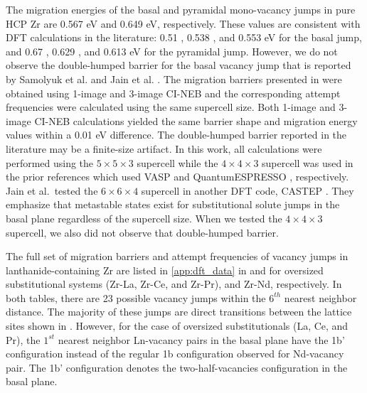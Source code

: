 \documentclass[preprint,12pt]{elsarticle}
\begin{document}
The migration energies of the basal and pyramidal mono-vacancy jumps in pure HCP Zr are 0.567 eV and 0.649 eV, respectively. These values are consistent with DFT calculations in the literature: 0.51 \cite{verite_anisotropy_2007}, 0.538 \cite{samolyuk_analysis_2014}, and 0.553 \cite{jain_first-principles_2019} eV for the basal jump, and  0.67 \cite{verite_anisotropy_2007}, 0.629 \cite{samolyuk_analysis_2014}, and 0.613 \cite{jain_first-principles_2019} eV for the pyramidal jump. However, we do not observe the double-humped barrier for the basal vacancy jump that is reported by Samolyuk et al. \cite{samolyuk_analysis_2014} and Jain et al. \cite{jain_first-principles_2019}. The migration barriers presented in  were obtained using 1-image and 3-image CI-NEB and the corresponding attempt frequencies were calculated using the same supercell size. Both 1-image and 3-image CI-NEB calculations yielded the same barrier shape and migration energy values within a 0.01 eV difference. The double-humped barrier reported in the literature may be a finite-size artifact. In this work, all calculations were performed using the $5\times5\times3$ supercell while the $4\times4\times3$ supercell was used in the prior references \cite{samolyuk_analysis_2014, jain_first-principles_2019} which used VASP \cite{kresse_ab_1993} and QuantumESPRESSO \cite{giannozzi_quantum_2009}, respectively. Jain et al.~tested the $6\times6\times4$ supercell \cite{jain_first-principles_2019} in another DFT code, CASTEP \cite{clark_first_2005}. They emphasize that metastable states exist for substitutional solute jumps in the basal plane regardless of the supercell size. When we tested the $4\times4\times3$ supercell, we also did not observe that double-humped barrier.

The full set of migration barriers and attempt frequencies of vacancy jumps in lanthanide-containing Zr are listed in \ref{app:dft_data} in  and  for oversized substitutional systems (Zr-La, Zr-Ce, and Zr-Pr), and Zr-Nd, respectively. In both tables, there are 23 possible vacancy jumps within the $6^{th}$ nearest neighbor distance. The majority of these jumps are direct transitions between the lattice sites shown in . However, for the case of oversized substitutionals (La, Ce, and Pr), the $1^{st}$ nearest neighbor Ln-vacancy pairs in the basal plane have the 1b' configuration instead of the regular 1b configuration observed for Nd-vacancy pair. The 1b' configuration denotes the two-half-vacancies configuration in the basal plane.
\end{document}
